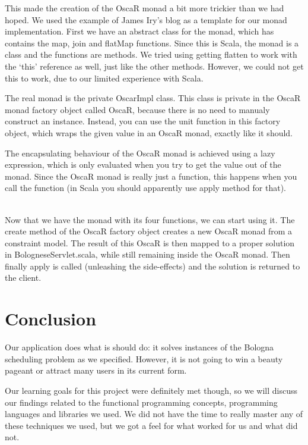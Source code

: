 \documentclass[a4paper]{article}
\begin{document}
This made the creation of the OscaR monad a bit more trickier than we had hoped.
We used the example of James Iry's blog\cite{elephants} as a template for our
monad implementation.
First we have an abstract class for the monad, 
which has contains the map, join and flatMap functions.
Since this is Scala, the monad is a class and the functions are methods.
We tried using getting flatten to work with the `this' reference as well,
just like the other methods.
However, we could not get this to work, due to our limited experience with Scala.

The real monad is the private OscarImpl class.
This class is private in the OscaR monad factory object called OscaR,
because there is no need to manualy construct an instance.
Instead, you can use the unit function in this factory object,
which wraps the given value in an OscaR monad, exactly like it should.

The encapsulating behaviour of the OscaR monad is achieved using a
lazy expression, 
which is only evaluated when you try to get the value out of the monad.
Since the OscaR monad is really just a function, 
this happens when you call the function 
(in Scala you should apparently use apply method for that).

\hspace*{1em}\\
Now that we have the monad with its four functions,
we can start using it.
The create method of the OscaR factory object creates a new OscaR monad
from a constraint model.
The result of this OscaR is then mapped to a proper solution in BologneseServlet.scala,
while still remaining inside the OscaR monad.
Then finally apply is called (unleashing the side-effects) 
and the solution is returned to the client.


\section{Conclusion}
\label{sec:conclusion}
Our application does what is should do:
it solves instances of the Bologna scheduling problem as we specified.
However, it is not going to win a beauty pageant or attract many users in its 
current form.

Our learning goals for this project were definitely met though,
so we will discuss our findings related to the functional programming concepts,
programming languages and libraries we used.
We did not have the time to really master any of these techniques we used,
but we got a feel for what worked for us and what did not.
\end{document}

